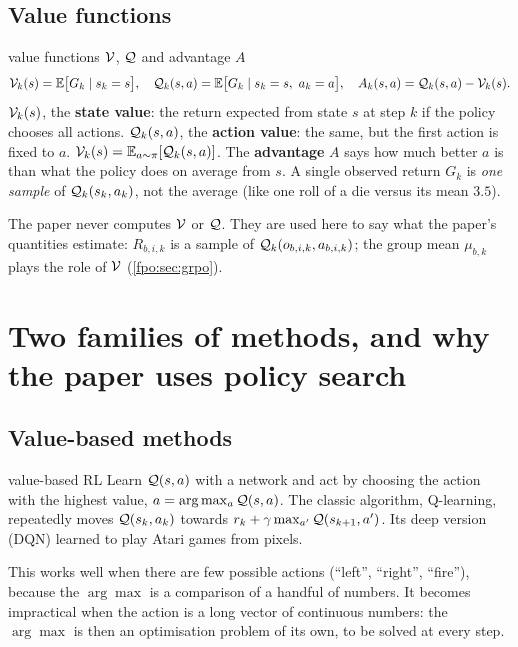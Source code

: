 \subsection{Value functions}
\begin{newc}{value functions $\mathcal{V}$, $\mathcal{Q}$ and advantage $A$}
\[
\mathcal{V}_k(s)=\mathbb{E}\big[G_k\mid s_k=s\big],\quad
\mathcal{Q}_k(s,a)=\mathbb{E}\big[G_k\mid s_k=s,\ a_k=a\big],\quad
A_k(s,a)=\mathcal{Q}_k(s,a)-\mathcal{V}_k(s).
\]
$\mathcal{V}_k(s)$, the \textbf{state value}: the return expected from state $s$ at step $k$ if the policy chooses all actions. $\mathcal{Q}_k(s,a)$, the \textbf{action value}: the same, but the first action is fixed to $a$. $\mathcal{V}_k(s)=\mathbb{E}_{a\sim\pi}[\mathcal{Q}_k(s,a)]$. The \textbf{advantage} $A$ says how much better $a$ is than what the policy does on average from $s$. A single observed return $G_k$ is \emph{one sample} of $\mathcal{Q}_k(s_k,a_k)$, not the average (like one roll of a die versus its mean $3.5$).
\end{newc}
\begin{paperlink}
The paper never computes $\mathcal{V}$ or $\mathcal{Q}$. They are used here to say what the paper's quantities estimate: $R_{b,i,k}$ is a sample of $\mathcal{Q}_k(o_{b,i,k},a_{b,i,k})$; the group mean $\mu_{b,k}$ plays the role of $\mathcal{V}$ (\cref{fpo:sec:grpo}).
\end{paperlink}

\section{Two families of methods, and why the paper uses policy search}\label{fpo:sec:families}

\subsection{Value-based methods}
\begin{newc}{value-based RL}
Learn $\mathcal{Q}(s,a)$ with a network and act by choosing the action with the highest value, $a=\arg\max_a\mathcal{Q}(s,a)$. The classic algorithm, Q-learning, repeatedly moves $\mathcal{Q}(s_k,a_k)$ towards $r_k+\gamma\max_{a'}\mathcal{Q}(s_{k+1},a')$. Its deep version (DQN) learned to play Atari games from pixels.
\end{newc}
This works well when there are few possible actions (``left'', ``right'', ``fire''), because the $\arg\max$ is a comparison of a handful of numbers. It becomes impractical when the action is a long vector of continuous numbers: the $\arg\max$ is then an optimisation problem of its own, to be solved at every step.

